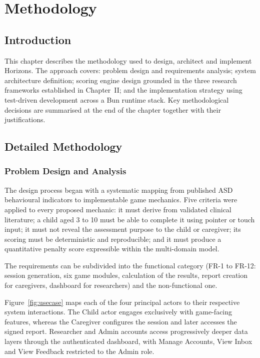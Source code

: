 \documentclass[12pt,a4paper,oneside]{report}
\begin{document}
\chapter{Methodology}

\section{Introduction}

This chapter describes the methodology used to design, architect and implement Horizons. The approach covers: problem design and requirements analysis; system architecture definition; scoring engine design grounded in the three research frameworks established in Chapter~II; and the implementation strategy using test-driven development across a Bun runtime stack. Key methodological decisions are summarised at the end of the chapter together with their justifications.

\section{Detailed Methodology}

\subsection{Problem Design and Analysis}

The design process began with a systematic mapping from published ASD behavioural indicators to implementable game mechanics. Five criteria were applied to every proposed mechanic: it must derive from validated clinical literature; a child aged 3 to 10 must be able to complete it using pointer or touch input; it must not reveal the assessment purpose to the child or caregiver; its scoring must be deterministic and reproducible; and it must produce a quantitative penalty score expressible within the multi-domain model.

The requirements can be subdivided into the functional category (FR-1 to FR-12: session generation, six game modules, calculation of the results, report creation for caregivers, dashboard for researchers) and the non-functional one.

Figure~\ref{fig:usecase} maps each of the four principal actors to their respective system interactions. The Child actor engages exclusively with game-facing features, whereas the Caregiver configures the session and later accesses the signed report. Researcher and Admin accounts access progressively deeper data layers through the authenticated dashboard, with Manage Accounts, View Inbox and View Feedback restricted to the Admin role.
\end{document}
